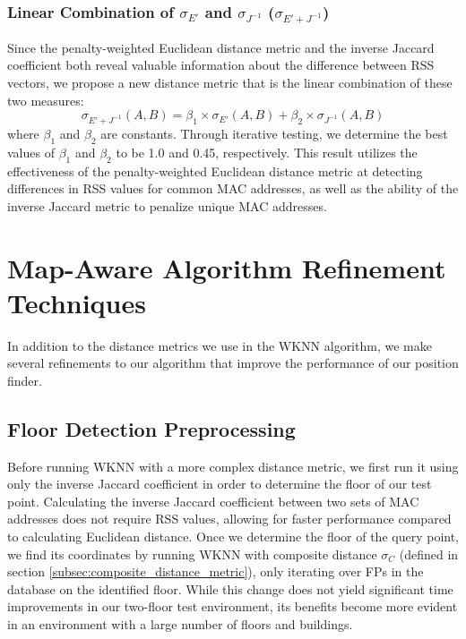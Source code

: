 \documentclass[conference]{IEEEtran}
\begin{document}
\subsubsection{Linear Combination of $\sigma_{E'}$ and $\sigma_{J^{-1}}$ ($\sigma_{E' + J^{-1}}$)}
\indent Since the penalty-weighted Euclidean distance metric and the inverse Jaccard coefficient both reveal valuable information about the difference between RSS vectors, we propose a new distance metric that is the linear combination of these two measures:
\begin{equation}
\label{eq:combined}
\sigma_{E'+J^{-1}}(A, B) = \beta_1\times\sigma_{E'}(A, B)+\beta_2\times\sigma_{J^{-1}}(A, B)
\end{equation}
where $\beta_1$ and $\beta_2$ are constants. Through iterative testing, we determine the best values of $\beta_1$ and $\beta_2$ to be 1.0 and 0.45, respectively. This result utilizes the effectiveness of the penalty-weighted Euclidean distance metric at detecting differences in RSS values for common MAC addresses, as well as the ability of the inverse Jaccard metric to penalize unique MAC addresses.

\section{Map-Aware Algorithm Refinement Techniques}

In addition to the distance metrics we use in the WKNN algorithm, we make several refinements to our algorithm that improve the performance of our position finder. 

\subsection{Floor Detection Preprocessing}\label{subsec:floor_preprocessing}
\indent Before running WKNN with a more complex distance metric, we first run it using only the inverse Jaccard coefficient in order to determine the floor of our test point. Calculating the inverse Jaccard coefficient between two sets of MAC addresses does not require RSS values, allowing for faster performance compared to calculating Euclidean distance. Once we determine the floor of the query point, we find its coordinates by running WKNN with composite distance $\sigma_C$ (defined in section \ref{subsec:composite_distance_metric}), only iterating over FPs in the database on the identified floor. While this change does not yield significant time improvements in our two-floor test environment, its benefits become more evident in an environment with a large number of floors and buildings.
\end{document}

